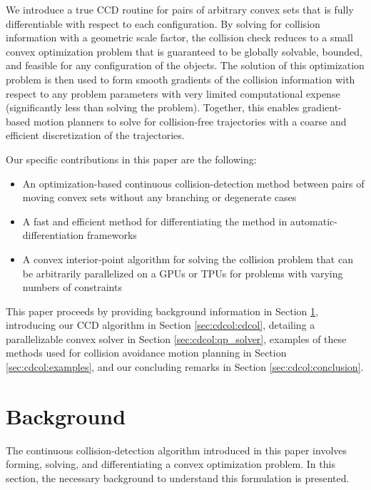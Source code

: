 We introduce a true CCD routine for pairs of arbitrary convex sets that is fully differentiable with respect to each configuration. By solving for collision information with a geometric scale factor, the collision check reduces to a small convex optimization problem that is guaranteed to be globally solvable, bounded, and feasible for any configuration of the objects.  The solution of this optimization problem is then used to form smooth gradients of the collision information with respect to any problem parameters with very limited computational expense (significantly less than solving the problem). Together, this enables gradient-based motion planners to solve for collision-free trajectories with a coarse and efficient discretization of the trajectories.

Our specific contributions in this paper are the following:
\begin{itemize}
    \item An optimization-based continuous collision-detection method between pairs of moving convex sets without any branching or degenerate cases 
    \item A fast and efficient method for differentiating the method in automatic-differentiation frameworks
    \item A convex interior-point algorithm for solving the collision problem that can be arbitrarily parallelized on a GPUs or TPUs for problems with varying numbers of constraints
\end{itemize}

This paper proceeds by providing background information in Section \ref{sec:cdcol:background}, introducing our CCD algorithm in Section \ref{sec:cdcol:cdcol}, detailing a parallelizable convex solver in Section \ref{sec:cdcol:qp_solver}, examples of these methods used for collision avoidance motion planning in Section \ref{sec:cdcol:examples}, and our concluding remarks in Section \ref{sec:cdcol:conclusion}.
%
%
%
%
\section{Background}\label{sec:cdcol:background}
%
%
%
%
The continuous collision-detection algorithm introduced in this paper involves forming, solving, and differentiating a convex optimization problem. In this section, the necessary background to understand this formulation is presented.


